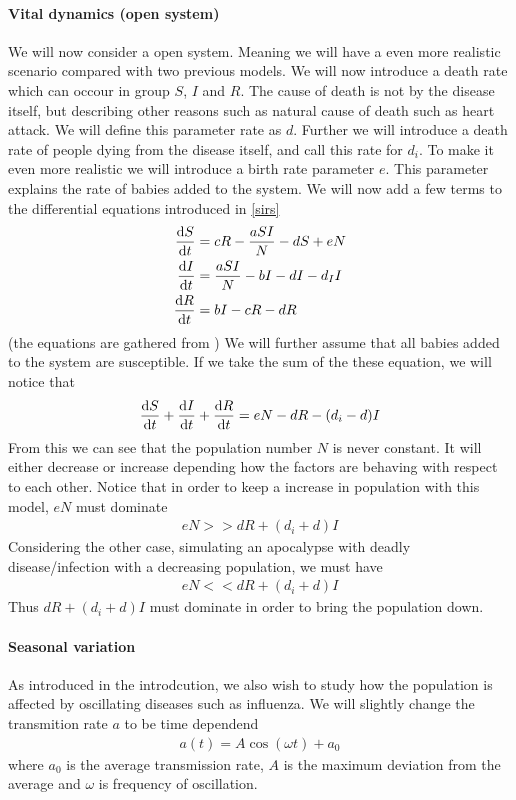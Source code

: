 \documentclass[a4paper, 10pt]{article}
\begin{document}
\paragraph{Vital dynamics (open system)}\label{vital dynamics} We will now consider a open system. Meaning
we will have a even more realistic scenario compared with two previous models. We will now introduce
a death rate which can occour in group $S$, $I$ and $R$. The cause of death is not by the disease itself, but describing
other reasons such as natural cause of death such as heart attack. We will define this parameter rate as
$d$. Further we will introduce a death rate of people dying from the disease itself, and call this rate for $d_{i}$.
To make it even more realistic we will introduce a birth rate parameter $e$. This parameter explains the rate of babies added to the system.
We will now add a few terms to the differential equations introduced in \eqref{sirs}
\begin{align*}
  \dv{S}{t} &= cR - \frac{aSI}{N} - dS + eN\\
  \dv{I}{t} &= \frac{aSI}{N} - bI - dI - d_{I}I\\
  \dv{R}{t} &= bI - cR - dR
\end{align*}
(the equations are gathered from \cite{DM})
We will further assume that all babies added to the system are susceptible.
If we take the sum of the these equation, we will notice that
\begin{align}
\dv{S}{t} + \dv{I}{t} + \dv{R}{t} = eN - dR - (d_{i} - d)I
\end{align}
From this we can see that the population number $N$ is never constant. It will either decrease or increase depending how the
factors are behaving with respect to each other.
Notice that in order to keep a increase in population with this model, $eN$ must dominate
\begin{align}
  eN >> dR + (d_{i} + d)I
\end{align}
Considering the other case, simulating an apocalypse with deadly disease/infection with a decreasing population, we must have
\begin{align}
  eN << dR + (d_{i} + d)I
\end{align}
Thus $dR + (d_{i} + d)I$ must dominate in order to bring the population down.
\paragraph{Seasonal variation}\label{seasonal variation} As introduced in the introdcution, we
also wish to study how the
population is affected by oscillating diseases such as influenza. We will
slightly change the transmition rate $a$ to be time dependend
\begin{align}
  a(t) = A\cos{(\omega t)} + a_{0}
\end{align}
where $a_{0}$ is the average transmission rate, $A$ is the maximum deviation
from the average and $\omega$ is frequency of oscillation.
\end{document}
